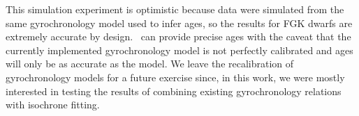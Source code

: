 

This simulation experiment is optimistic because data were simulated from the
same gyrochronology model used to infer ages, so the results for FGK dwarfs
are extremely accurate by design.
\sd\ can provide precise ages with the caveat that the currently implemented
gyrochronology model is not perfectly calibrated and ages will only be as
accurate as the model.
We leave the recalibration of gyrochronology models for a future exercise
since, in this work, we were mostly interested in testing the results of
combining existing gyrochronology relations with isochrone fitting.

